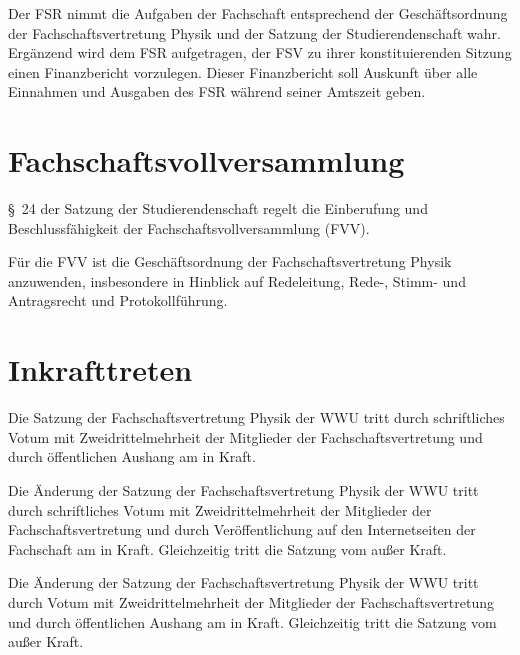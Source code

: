 \documentclass[
	a4paper,
	12pt,
	oneside,
	parskip=half-,
	pagesize,
	headsepline,
	german,
	ngerman
]{scrartcl}
\begin{document}
Der FSR nimmt die Aufgaben der Fachschaft entsprechend der Geschäftsordnung der Fachschaftsvertretung Physik und der Satzung der Studierendenschaft wahr. Ergänzend wird dem FSR aufgetragen, der FSV zu ihrer konstituierenden Sitzung einen Finanzbericht vorzulegen. Dieser Finanzbericht soll Auskunft über alle Einnahmen und Ausgaben des FSR während seiner Amtszeit geben.

\section{Fachschaftsvollversammlung}
§~24 der Satzung der Studierendenschaft regelt die Einberufung und Beschlussfähigkeit der Fachschaftsvollversammlung (FVV).

Für die FVV ist die Geschäftsordnung der Fachschaftsvertretung Physik anzuwenden, insbesondere in Hinblick auf Redeleitung, Rede-, Stimm- und Antragsrecht und Protokollführung.

\section{Inkrafttreten}
Die Satzung der Fachschaftsvertretung Physik der WWU tritt durch schriftliches Votum mit Zweidrittelmehrheit der Mitglieder der Fachschaftsvertretung und durch öffentlichen Aushang am  in Kraft.

Die Änderung der Satzung der Fachschaftsvertretung Physik der WWU tritt durch schriftliches Votum mit Zweidrittelmehrheit der Mitglieder der Fachschaftsvertretung und durch Veröffentlichung auf den Internetseiten der Fachschaft am  in Kraft. Gleichzeitig tritt die Satzung vom  außer Kraft.

Die Änderung der Satzung der Fachschaftsvertretung Physik der WWU tritt durch Votum mit Zweidrittelmehrheit der Mitglieder der Fachschaftsvertretung und durch öffentlichen Aushang am  in Kraft. Gleichzeitig tritt die Satzung vom  außer Kraft.
\end{document}

